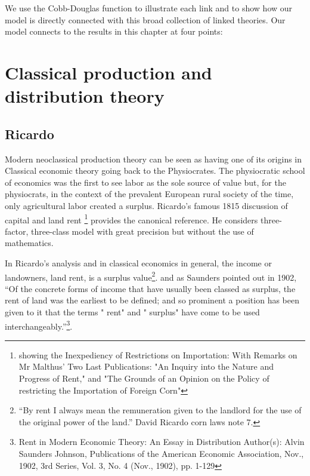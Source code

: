 We use the Cobb-Douglas function %
to illustrate each link and to show how our  model is directly connected with this broad collection of linked theories. Our model connects to the results in this chapter at four points:



\section{Classical production and distribution theory}


 \subsection{Ricardo}

Modern neoclassical production theory can be seen as having one of its origins in  Classical economic theory going back to the Physiocrates. The physiocratic school of economics was the first to see labor as the sole source of value but, for the physiocrats, in the context of the prevalent European rural society of the time, only agricultural labor created a surplus. Ricardo's famous 1815 discussion of capital and  land rent \footnote{ %
showing the Inexpediency of Restrictions on Importation: With Remarks on Mr Malthus' Two Last Publications: "An Inquiry into the Nature and Progress of Rent," and "The Grounds of an Opinion on the Policy of restricting the Importation of Foreign Corn" } 
provides the canonical reference. He considers three-factor, three-class model with great precision but without the use of mathematics.   

In Ricardo's analysis and in classical economics in general, the income or landowners, land rent, is a surplus value\footnote{``By rent I always mean the remuneration given to the landlord for the use of the original power of the land.'' David Ricardo corn laws note 7.}. 
and as Saunders pointed out in 1902, ``Of the concrete forms of income that have usually been classed as surplus, the rent of land was the earliest to be defined; and so prominent a position has been given to it that the terms " rent" and " surplus" have come to be used interchangeably.''\footnote{Rent in Modern Economic Theory: An Essay in Distribution Author(s): Alvin Saunders Johnson, Publications of the American Economic Association, Nov., 1902, 3rd Series, Vol. 3, No. 4 (Nov., 1902), pp. 1-129}. 

